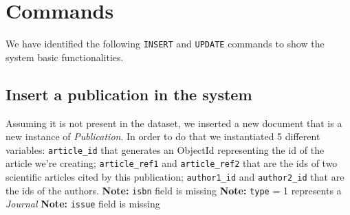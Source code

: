 \documentclass{Configuration_Files/PoliMi3i_thesis}
\begin{document}
\section{Commands}
We have identified the following \verb |INSERT| and \verb |UPDATE| commands to show the system basic functionalities.

\subsection{Insert a publication in the system}
\label{pub_insert}
Assuming it is not present in the dataset, we inserted a new document that is a new instance of \emph{Publication}.
In order to do that we instantiated 5 different variables: \verb |article_id| that generates an ObjectId representing
the id of the article we're creating; \verb |article_ref1| and \verb |article_ref2| that are the ids of two scientific
articles cited by this publication; \verb |author1_id| and \verb |author2_id| that are the ids of the authors.\newline
\textbf{Note:} \verb |isbn| field is missing \newline
\textbf{Note:} \verb |type| = 1 represents a \emph{Journal} \newline
\textbf{Note:} \verb |issue| field is missing
\end{document}
